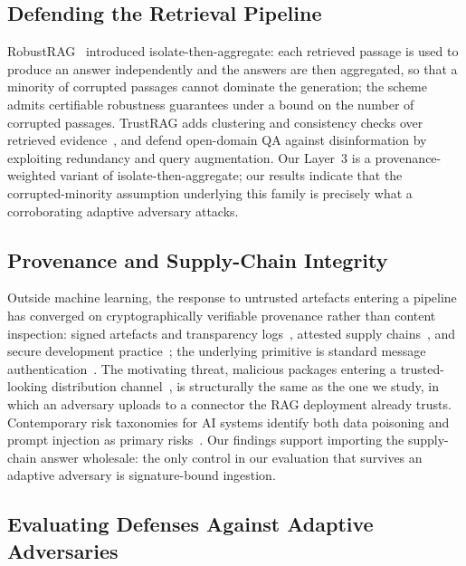 \subsection{Defending the Retrieval Pipeline}

RobustRAG~\citep{xiang2024robustrag} introduced isolate-then-aggregate: each retrieved passage
is used to produce an answer independently and the answers are then aggregated, so that a
minority of corrupted passages cannot dominate the generation; the scheme admits certifiable
robustness guarantees under a bound on the number of corrupted passages. TrustRAG adds
clustering and consistency checks over retrieved evidence~\citep{zhou2025trustrag}, and
\citet{weller2024defending} defend open-domain QA against disinformation by exploiting
redundancy and query augmentation. Our Layer~3 is a provenance-weighted variant of
isolate-then-aggregate; our results indicate that the corrupted-minority assumption underlying
this family is precisely what a corroborating adaptive adversary attacks.

\subsection{Provenance and Supply-Chain Integrity}

Outside machine learning, the response to untrusted artefacts entering a pipeline has converged
on cryptographically verifiable provenance rather than content inspection: signed artefacts and
transparency logs~\citep{newman2022sigstore}, attested supply
chains~\citep{torresarias2019intoto}, and secure development
practice~\citep{nist2022ssdf}; the underlying primitive is standard message
authentication~\citep{krawczyk1997hmac}. The motivating threat, malicious packages entering a
trusted-looking distribution channel~\citep{ohm2020backstabber}, is structurally the same as
the one we study, in which an adversary uploads to a connector the RAG deployment already
trusts. Contemporary risk taxonomies for AI systems identify both data poisoning and prompt
injection as primary risks~\citep{vassilev2024nistaml,owasp2025llm}. Our findings support
importing the supply-chain answer wholesale: the only control in our evaluation that survives
an adaptive adversary is signature-bound ingestion.

\subsection{Evaluating Defenses Against Adaptive Adversaries}

